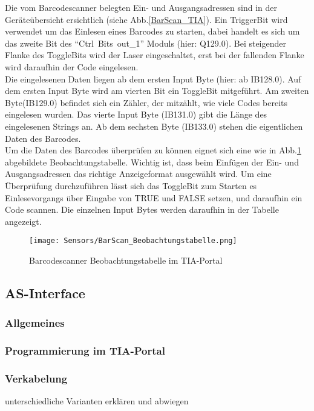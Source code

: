Die vom Barcodescanner belegten Ein- und Ausgangsadressen sind in der Geräteübersicht ersichtlich (siehe Abb.\ref{BarScan_TIA}). Ein TriggerBit wird verwendet um das Einlesen eines Barcodes zu starten, dabei handelt es sich um das zweite Bit des \enquote{\mbox{Ctrl Bits out\_1}} Moduls (hier: Q129.0). Bei steigender Flanke des ToggleBits wird der Laser eingeschaltet, erst bei der fallenden Flanke wird daraufhin der Code eingelesen.\\
Die eingelesenen Daten liegen ab dem ersten Input Byte (hier: ab IB128.0). Auf dem ersten Input Byte wird am vierten Bit ein ToggleBit mitgeführt. Am zweiten Byte(IB129.0) befindet sich ein Zähler, der mitzählt, wie viele Codes bereits eingelesen wurden. Das vierte Input Byte (IB131.0) gibt die Länge des eingelesenen Strings an. Ab dem sechsten Byte (IB133.0) stehen die eigentlichen Daten des Barcodes.\\
Um die Daten des Barcodes überprüfen zu können eignet sich eine wie in Abb.\ref{BarScan_BTabelle} abgebildete Beobachtungstabelle. Wichtig ist, dass beim Einfügen der Ein- und Ausgangsadressen das richtige Anzeigeformat ausgewählt wird. Um eine Überprüfung durchzuführen lässt sich das ToggleBit zum Starten es Einlesevorgangs über Eingabe von TRUE und FALSE setzen, und daraufhin ein Code scannen. Die einzelnen Input Bytes werden daraufhin in der Tabelle angezeigt.

\begin{figure}[H]
    \centering
    \texttt{[image: Sensors/BarScan\_Beobachtungstabelle.png]}
    \caption{Barcodescanner Beobachtungstabelle im TIA-Portal}
    \label{BarScan_BTabelle}
\end{figure}

\subsection{AS-Interface}

\subsubsection{Allgemeines}

\subsubsection{Programmierung im TIA-Portal}

\subsubsection{Verkabelung}
unterschiedliche Varianten erklären und abwiegen

